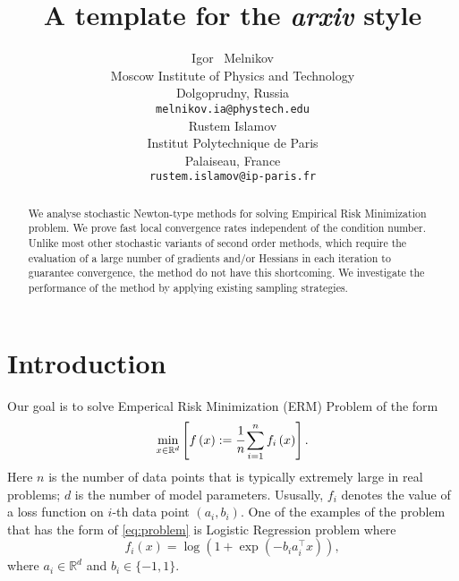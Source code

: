 \documentclass{article}
\title{A template for the \emph{arxiv} style}
\author{ Igor ~Melnikov	\\
	Moscow Institute of Physics and Technology\\
	Dolgoprudny, Russia \\
	\texttt{melnikov.ia@phystech.edu} \\
	\And
	Rustem Islamov \\
	Institut Polytechnique de Paris\\
	Palaiseau, France \\
	\texttt{rustem.islamov@ip-paris.fr} \\
}
\date{}
\begin{document}
\maketitle

\begin{abstract}
We analyse stochastic Newton-type methods for solving Empirical Risk Minimization problem. We prove fast local convergence rates independent of the condition number. Unlike most other stochastic variants of second order methods, which require the evaluation of a large number of gradients and/or Hessians in each iteration to guarantee convergence, the method do not have this shortcoming. We investigate the performance of the method by applying existing sampling strategies.
\end{abstract}

\section{Introduction}

Our goal is to solve Emperical Risk Minimization (ERM) Problem of the form
\begin{equation}\label{eq:problem}
    \min\limits_{x\in \mathbb{R}^d} \left[f\left(x\right):=\cfrac{1}{n}\sum\limits_{i=1}^{n}f_i\left(x\right)\right].
\end{equation}
Here $n$ is the number of data points that is typically extremely large in real problems; $d$ is the number of model parameters. Ususally, $f_i$ denotes the value of a loss function on $i$-th data point $(a_i, b_i)$. One of the examples of the problem that has the form of \eqref{eq:problem} is Logistic Regression problem where
\begin{equation}
    f_i(x) = \log\left(1+\exp(-b_i a_i^\top x )\right),
\end{equation}
where $a_i \in \mathbb{R}^d$ and $b_i \in \{-1,1\}.$
\end{document}

